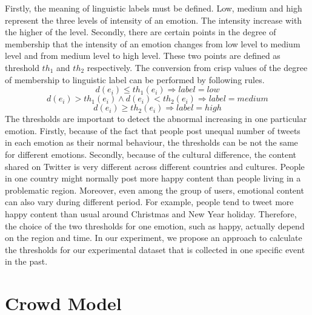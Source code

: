 Firstly, the meaning of linguistic labels must be defined. Low, medium and high represent the three levels of intensity of an emotion. The intensity increase with the higher of the level. Secondly, there are certain points in the degree of membership that the intensity of an emotion changes from low level to medium level and from medium level to high level. These two points are defined as threshold \(th_1\) and \(th_2\) respectively. The conversion from crisp values of the degree of membership to linguistic label can be performed by following rules.
\[
d(e_i) \leq th_1(e_i) \Rightarrow label = low
\]
\[
d(e_i) > th_1(e_i) \land d(e_i) < th_2(e_i) \Rightarrow label = medium
\]
\[
d(e_i) \geq th_2(e_i) \Rightarrow label = high
\]
The thresholds are important to detect the abnormal increasing in one particular emotion. Firstly, because of the fact that people post unequal number of tweets in each emotion as their normal behaviour, the thresholds can be not the same for different emotions. Secondly, because of the cultural difference, the content shared on Twitter is very different across different countries and cultures. People in one country might normally post more happy content than people living in a problematic region. Moreover, even among the group of users, emotional content can also vary during different period. For example, people tend to tweet more happy content than usual around Christmas and New Year holiday. Therefore, the choice of the two thresholds for one emotion, such as happy, actually depend on the region and time. In our experiment, we propose an approach to calculate the thresholds for our experimental dataset that is collected in one specific event in the past.

\section{Crowd Model}

